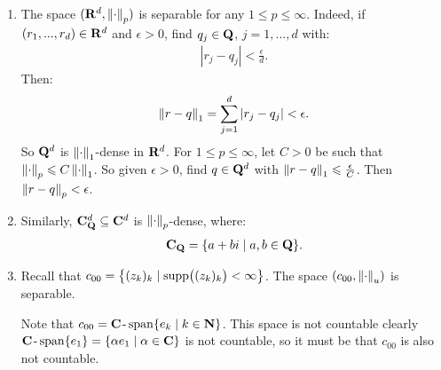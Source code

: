     \begin{example}
        \phantom{a}
        \begin{enumerate}[label = (\arabic*),itemsep=1pt,topsep=3pt]
            \item The space $(\bfR^d,\lnorm \cdot \rnorm_p)$ is separable for any $1 \leq p \leq \infty$. Indeed, if $(r_1,...,r_d) \in \bfR^d$ and $\epsilon > 0$, find $q_j \in \bfQ$, $j = 1,...,d$ with:
                \begin{equation*}
                \begin{split}
                    |r_j - q_j| < \frac{\epsilon}{d}.
                \end{split}
                \end{equation*}
            Then:
                \begin{equation*}
                \begin{split}
                    \lnorm r-q \rnorm_1 = \sum_{j = 1}^d |r_j - q_j| < \epsilon.
                \end{split}
                \end{equation*}
            So $\bfQ^d$ is $\lnorm \cdot \rnorm_1$-dense in $\bfR^d$. For $1 \leq p \leq \infty$, let $C>0$ be such that \newline $\lnorm \cdot \rnorm_p \leq C \lnorm \cdot \rnorm_1$. So given $\epsilon > 0$, find $q \in \bfQ^d$ with $\lnorm r - q \rnorm_1 \leq \frac{\epsilon}{C}$. Then $\lnorm r - q \rnorm_p < \epsilon$.

            \item Similarly, $\bfC_\bfQ^d \subseteq \bfC^d$ is $\lnorm \cdot \rnorm_p$-dense, where:
                \begin{equation*}
                \begin{split}
                    \bfC_\bfQ = \{a+bi \mid a,b \in \bfQ\}.
                \end{split}
                \end{equation*}

            \item Recall that $c_{00} = \left\{(z_k)_k \mid \supp \bigl((z_k)_k\bigr) < \infty \right\}$. The space $(c_{00},\lnorm \cdot \rnorm_u)$ is separable.
            
            Note that $c_{00} = \bfC\text{\h1-}\Span\{e_k \mid k \in \bfN\}$. This space is not countable \textemdash clearly $\bfC\text{\h1-}\Span\{e_1\} = \{\alpha e_1 \mid \alpha \in \bfC\}$ is not countable, so it must be that $c_{00}$ is also not countable.


\end{enumerate}
\end{example}
